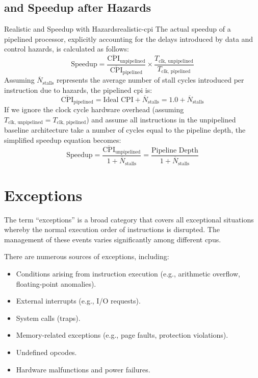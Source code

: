 \subsection{ and Speedup after Hazards}
\begin{concept}{Realistic  and Speedup with Hazards}{realistic-cpi}
    The actual speedup of a pipelined processor, explicitly accounting for the delays introduced by data and control hazards, is calculated as follows:
    \[\text{Speedup} = \frac{\overline{\text{CPI}}_{\text{unpipelined}}}{\overline{\text{CPI}}_{\text{pipelined}}} \times \frac{T_{\text{clk, unpipelined}}}{T_{\text{clk, pipelined}}}\]
    Assuming \(\overline{N}_{\text{stalls}}\) represents the average number of stall cycles introduced per instruction due to hazards, the pipelined \gls{cpi} is:
    \[\overline{\text{CPI}}_{\text{pipelined}} = \text{Ideal CPI} + \overline{N}_{\text{stalls}} = 1.0 + \overline{N}_{\text{stalls}}\]
    If we ignore the clock cycle hardware overhead (assuming \(T_{\text{clk, unpipelined}} = T_{\text{clk, pipelined}}\)) and assume all instructions in the unpipelined baseline architecture take a number of cycles equal to the pipeline depth, the simplified speedup equation becomes:
    \[\text{Speedup} = \frac{\overline{\text{CPI}}_{\text{unpipelined}}}{1 + \overline{N}_{\text{stalls}}} = \frac{\text{Pipeline Depth}}{1 + \overline{N}_{\text{stalls}}}\]
\end{concept}

\section{Exceptions}
The term ``exceptions'' is a broad category that covers all exceptional situations whereby the normal execution order of instructions is disrupted. The management of these events varies significantly among different \glspl{cpu}. 

There are numerous sources of exceptions, including:
\begin{itemize}
    \item Conditions arising from instruction execution (e.g., arithmetic overflow, floating-point anomalies).
    \item External interrupts (e.g., I/O requests).
    \item System calls (traps).
    \item Memory-related exceptions (e.g., page faults, protection violations).
    \item Undefined opcodes.
    \item Hardware malfunctions and power failures.
\end{itemize}

